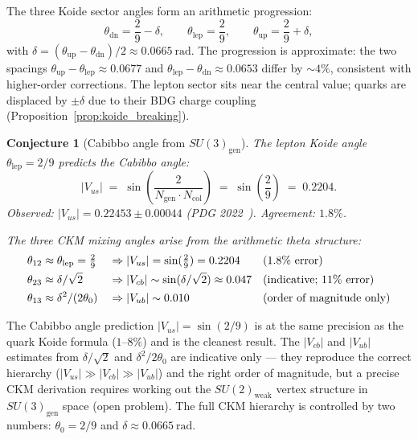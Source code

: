 \documentclass[11pt,a4paper]{article}
\newtheorem{conjecture}[theorem]{Conjecture}
\begin{document}
The three Koide sector angles form an arithmetic progression:
\begin{equation}
  \theta_{\mathrm{dn}} = \frac{2}{9} - \delta, \qquad
  \theta_{\mathrm{lep}} = \frac{2}{9}, \qquad
  \theta_{\mathrm{up}} = \frac{2}{9} + \delta,
  \label{eq:theta_arithmetic}
\end{equation}
with $\delta = (\theta_{\mathrm{up}} - \theta_{\mathrm{dn}})/2 \approx
0.0665~\mathrm{rad}$. The progression is approximate: the two spacings
$\theta_{\mathrm{up}} - \theta_{\mathrm{lep}} \approx 0.0677$ and
$\theta_{\mathrm{lep}} - \theta_{\mathrm{dn}} \approx 0.0653$ differ by
$\sim 4\%$, consistent with higher-order corrections.
The lepton sector sits near the central value; quarks are displaced by
$\pm\delta$ due to their BDG charge coupling (Proposition~\ref{prop:koide_breaking}).

\begin{conjecture}[Cabibbo angle from $SU(3)_{\mathrm{gen}}$]
\label{conj:cabibbo}
The lepton Koide angle $\theta_{\mathrm{lep}} = 2/9$ predicts the Cabibbo
angle:
\begin{equation}
  |V_{us}| \;=\; \sin\!\left(\frac{2}{N_{\mathrm{gen}}\cdot N_{\mathrm{col}}}\right)
  \;=\; \sin\!\left(\frac{2}{9}\right) \;=\; 0.2204.
  \label{eq:cabibbo_pred}
\end{equation}
Observed: $|V_{us}| = 0.22453 \pm 0.00044$ (PDG 2022~\citep{PDG2022}).
Agreement: $1.8\%$.

The three CKM mixing angles arise from the arithmetic theta structure:
\begin{align}
  \theta_{12} &\approx \theta_{\mathrm{lep}} = \tfrac{2}{9}
    && \Rightarrow |V_{us}| = \sin(\tfrac{2}{9}) = 0.2204
    && \text{(1.8\% error)} \notag \\
  \theta_{23} &\approx \delta/\sqrt{2}
    && \Rightarrow |V_{cb}| \sim \sin(\delta/\sqrt{2}) \approx 0.047
    && \text{(indicative; 11\% error)} \notag \\
  \theta_{13} &\approx \delta^2/(2\theta_0)
    && \Rightarrow |V_{ub}| \sim 0.010
    && \text{(order of magnitude only)} \notag
\end{align}
\end{conjecture}

The Cabibbo angle prediction $|V_{us}| = \sin(2/9)$ is at the same
precision as the quark Koide formula ($1$--$8\%$) and is the cleanest
result. The $|V_{cb}|$ and $|V_{ub}|$ estimates from $\delta/\sqrt{2}$
and $\delta^2/2\theta_0$ are indicative only --- they reproduce the
correct hierarchy ($|V_{us}| \gg |V_{cb}| \gg |V_{ub}|$) and the right
order of magnitude, but a precise CKM derivation requires working out
the $SU(2)_{\mathrm{weak}}$ vertex structure in $SU(3)_{\mathrm{gen}}$
space (open problem). The full CKM hierarchy is controlled by two numbers:
$\theta_0 = 2/9$ and $\delta \approx 0.0665~\mathrm{rad}$.
\end{document}
